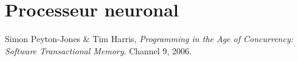 \documentclass{article}
\begin{document}
\newpage

\section*{Processeur neuronal}


\renewcommand\refname{Références NPU}
\begin{thebibliography}{9}
          Simon Peyton-Jones \& Tim Harris,
          \emph{Programming in the Age of Concurrency: Software Transactional Memory}.
          Channel 9, 2006.
         
\end{thebibliography}
\end{document}
